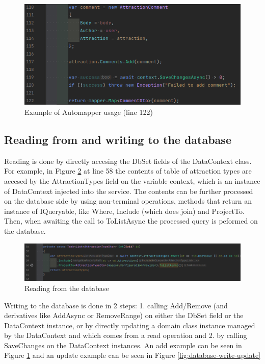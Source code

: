 \begin{figure}[!ht]
    \centering
    \includegraphics[width=1\linewidth]{4.3.2_automapper-usage.png}
    \caption{Example of Automapper usage (line 122)}
    \label{fig:automapper-usage}
\end{figure}


\subsection{Reading from and writing to the database}

\par Reading is done by directly accesing the DbSet fields of the DataContext class. For example, in Figure \ref{fig:database-read} at line 58 the contents of table of attraction types are accesed by the AttractionTypes field on the variable context, which is an instance of DataContext injected into the service. The contents can be further processed on the database side by using non-terminal operations, methods that return an instance of IQueryable, like Where, Include (which does join) and ProjectTo. Then, when awaiting the call to ToListAsync the processed query is peformed on the database.

\begin{figure}[!ht]
    \centering
    \includegraphics[width=1\linewidth]{4.3.3_database-read.png}
    \caption{Reading from the database}
    \label{fig:database-read}
\end{figure}

\par Writing to the database is done in 2 steps: 1. calling Add/Remove (and derivatives like AddAsync or RemoveRange) on either the DbSet field or the DataContext instance, or by directly updating a domain class instance managed by the DataContext and which comes from a read operation and 2. by calling SaveChanges on the DataContext instances. An add example can be seen in Figure \ref{fig:automapper-usage} and an update example can be seen in Figure \ref{fig:database-write-update}

